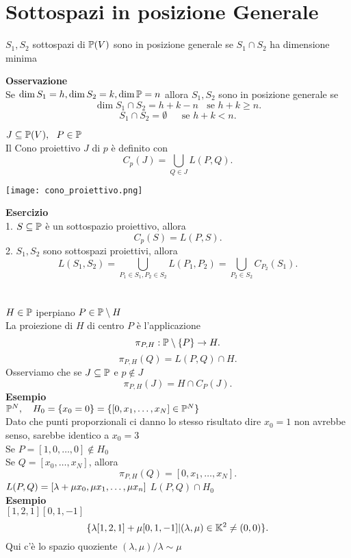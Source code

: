 \documentclass[12px]{article}
\begin{document}
	\section{Sottospazi in posizione Generale}
	\begin{defi}
		$S_1, S_2$ sottospazi di $\mathbb{P}(V)$ sono in posizione generale se $S_1\cap S_2$ ha dimensione minima
	\end{defi}
	\textbf{Osservazione}\\
	Se $\dim S_1 = h, \dim S_2 = k, \dim\mathbb{P} =n$ allora $S_1,S_2$ sono in posizione generale se 
	\[
		\dim S_1\cap S_2 = h + k - n \ \ \ \ \text{se } h+k\geq n
	.\]\[
	S_1\cap S_2 = \emptyset \ \ \ \ \ \ \ \text{se } h + k <n
.\]
\begin{defi}
$J\subseteq\mathbb{P}(V), \ \ P\in \mathbb{P}$\\
Il Cono proiettivo  $J$ di $p$ è definito con 
\[
	C_p(J) = \bigcup_{Q\in J}L(P,Q)
.\] 
\end{defi}
\begin{center}
\texttt{[image: cono\_proiettivo.png]}\\
\end{center}
\textbf{Esercizio}\\
1. $S\subseteq\mathbb{P}$ è un sottospazio proiettivo, allora 
\[
 C_p(S) = L(P,S) 
.\] 
2. $S_1, S_2$ sono sottospazi proiettivi, allora 
\[
	L(S_1,S_2) = \bigcup_{P_1\in S_1, P_2\in S_2} L(P_1,P_2) = \bigcup_{P_2\in S_2} C_{P_2}(S_1)
.\] 
\ \\ \hline \ \\
$H\in \mathbb{P}$ iperpiano $P\in \mathbb{P}\setminus H$\\
La proiezione di  $H$ di centro $P$ è l'applicazione
\[
	\pi_{P,H}:\mathbb{P}\setminus\{P\} \rightarrow H
.\] 
\[
	\pi_{P,H}(Q) = L(P,Q) \cap H
.\] 
Osserviamo che se $J\subseteq \mathbb{P}$ e $p\notin J$
 \[
	 \pi_{P,H}(J) = H\cap C_P(J)
.\] 
\textbf{Esempio}\\
$\mathbb{P}^N, \ \ \ H_0 = \{x_0=0\} = \{[0,x_1,\ldots,x_N]\in \mathbb{P}^N\}$\\
Dato che punti proporzionali ci danno lo stesso risultato dire $x_0 = 1$ non avrebbe senso, sarebbe identico a $x_0=3$\\[10px]
Se $P = [1,0,\ldots,0]\notin H_0$\\
Se $Q = [x_0,\ldots,x_N]$, allora
\[
	\pi_{P,H}(Q) = [0,x_1,\ldots,x_N]
.\] 
$L(P,Q) = [ \lambda + \mu x_0, \mu x_1,\ldots, \mu x_n]\\$
$L(P,Q)\cap H_0$\\
\textbf{Esempio}\\
$[1,2,1] [0,1,-1]$\\
\[
	\{ \lambda [1,2,1] + \mu [0,1,-1] | ( \lambda,\mu)\in \mathbb{K}^2 \neq(0,0)\}
.\] 
Qui c'è lo spazio quoziente $( \lambda,\mu) / \lambda \sim \mu $
\ \\ \hline \ \\ 
\end{document}
